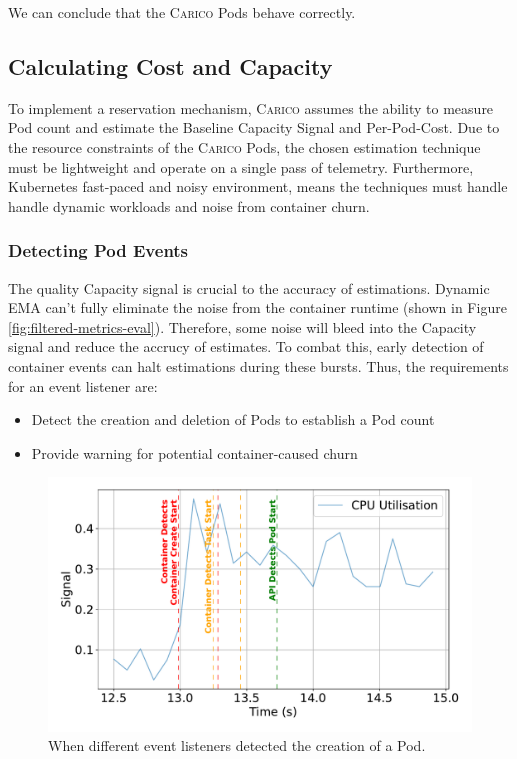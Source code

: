 We can conclude that the \textsc{Carico} Pods behave correctly.

\subsection{Calculating Cost and Capacity}
To implement a reservation mechanism, \textsc{Carico} assumes the ability to
measure Pod count and estimate the Baseline Capacity Signal and Per-Pod-Cost.
Due to the resource constraints of the \textsc{Carico} Pods, the chosen
estimation technique must be lightweight and operate on a single pass of
telemetry. Furthermore, Kubernetes fast-paced and noisy environment, means the
techniques must handle handle dynamic workloads and noise from container churn.

\subsubsection{Detecting Pod Events}
\label{sec:listeners-comparison}
The quality Capacity signal is crucial to the accuracy of estimations. Dynamic
EMA can't fully eliminate the noise from the container runtime (shown in Figure
\ref{fig:filtered-metrics-eval}). Therefore, some noise will bleed into the
Capacity signal and reduce the accrucy of estimates. To combat this, early
detection of container events can halt estimations during these bursts. Thus,
the requirements for an event listener are:
\begin{itemize}
    \item Detect the creation and deletion of Pods to establish a Pod count
    \item Provide warning for potential container-caused churn
\end{itemize}

\begin{figure}[ht]
    \centering
    \includegraphics[width=\textwidth]{images/event-comparison-start.pdf}
    \caption{When different event listeners detected the creation of a Pod.}
    \label{fig:event-evaluation-start}
\end{figure}

